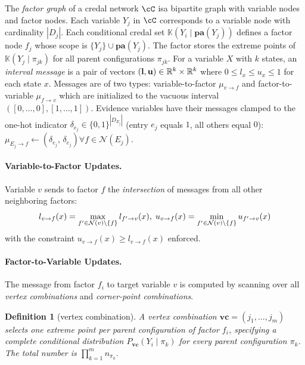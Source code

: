\documentclass{article}
\newtheorem{definition}{Definition}
\newcommand{\kr}[1]{\mathbb{K}\!\left( #1 \right)}
\begin{document}
The \emph{factor graph} of a credal network $\cC$ isa bipartite graph with variable nodes and factor nodes. Each variable $Y_j$ in $\cC$ corresponds to a variable node with cardinality $|D_j|$. Each conditional credal set $\kr{Y_i \mid \mathbf{pa}(Y_j)}$ defines a factor node $f_j$ whose scope is $\{Y_j\} \cup \mathbf{pa}(Y_j)$. The factor stores the extreme points of $\kr{Y_j \mid \pi_{jk}}$ for all parent configurations $\pi_{jk}$. For a variable $X$ with $k$ states, an \emph{interval message} is a pair of vectors $(\mathbf{l}, \mathbf{u}) \in \mathbb{R}^k \times \mathbb{R}^k$ where $0 \leq l_x \leq u_x \leq 1$ for each state $x$. Messages are of two types: variable-to-factor $\mu_{v \to f}$ and factor-to-variable $\mu_{f \to v}$ which are initialized to the vacuous interval $([0, \dots, 0], [1, \dots, 1])$. Evidence variables have their messages clamped to the one-hot indicator $\delta_{e_j} \in \{0,1\}^{|D_{E_j}|}$ (entry $e_j$ equals $1$, all others equal $0$): $\mu_{E_j \to f} \gets (\delta_{e_j},\, \delta_{e_j})
  \forall f \in \mathcal{N}(E_j)$.

\paragraph{Variable-to-Factor Updates.} Variable $v$ sends to factor $f$ the \emph{intersection} of messages from all other neighboring factors:
\begin{equation}
  l_{v \to f}(x) = \max_{f' \in \mathcal{N}(v) \setminus \{f\}} l_{f' \to v}(x), \;
  u_{v \to f}(x) = \min_{f' \in \mathcal{N}(v) \setminus \{f\}} u_{f' \to v}(x)
\end{equation}
with the constraint $u_{v \to f}(x) \geq l_{v \to f}(x)$ enforced.

\paragraph{Factor-to-Variable Updates.} The message from factor $f_i$ to target variable $v$ is computed by scanning over all \emph{vertex combinations} and \emph{corner-point combinations}.

\begin{definition}[vertex combination]
    A \emph{vertex combination} $\mathbf{vc} = (j_1, \dots, j_m)$ selects one extreme point per parent configuration of factor $f_i$, specifying a complete conditional distribution $P_{\mathbf{vc}}(Y_i \mid \pi_k)$ for every parent configuration $\pi_k$. The total number is $\prod_{k=1}^{m} n_{\pi_k}$.
\end{definition}
\end{document}
